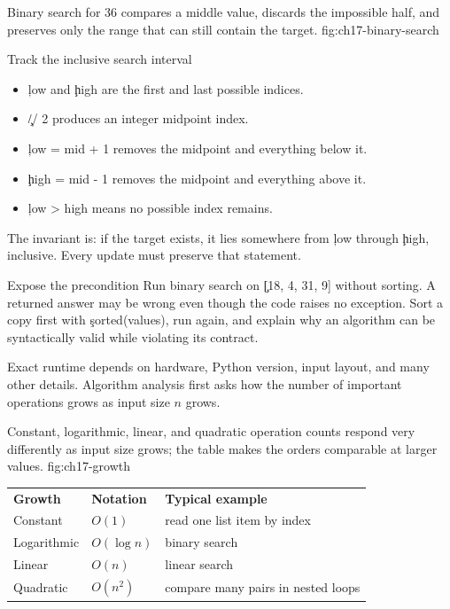 {Binary search for 36 compares a middle value, discards the impossible half, and preserves only the range that can still contain the target.}
{fig:ch17-binary-search}

\begin{SyntaxBox}{Track the inclusive search interval}
\begin{itemize}
    \item \c{low} and \c{high} are the first and last possible indices.
    \item \c{// 2} produces an integer midpoint index.
    \item \c{low = mid + 1} removes the midpoint and everything below it.
    \item \c{high = mid - 1} removes the midpoint and everything above it.
    \item \c{low > high} means no possible index remains.
\end{itemize}
The invariant is: if the target exists, it lies somewhere from \c{low} through
\c{high}, inclusive. Every update must preserve that statement.
\end{SyntaxBox}

\begin{TryBox}{Expose the precondition}
Run binary search on \c{[18, 4, 31, 9]} without sorting. A returned answer may
be wrong even though the code raises no exception. Sort a copy first with
\c{sorted(values)}, run again, and explain why an algorithm can be syntactically
valid while violating its contract.
\end{TryBox}


Exact runtime depends on hardware, Python version, input layout, and many other
details. Algorithm analysis first asks how the number of important operations
grows as input size $n$ grows.

{Constant, logarithmic, linear, and quadratic operation counts respond very differently as input size grows; the table makes the orders comparable at larger values.}
{fig:ch17-growth}

\begin{center}
\begin{tabular}{lll}
\textbf{Growth} & \textbf{Notation} & \textbf{Typical example} \\
Constant & $O(1)$ & read one list item by index \\
Logarithmic & $O(\log n)$ & binary search \\
Linear & $O(n)$ & linear search \\
Quadratic & $O(n^2)$ & compare many pairs in nested loops \\
\end{tabular}
\end{center}


